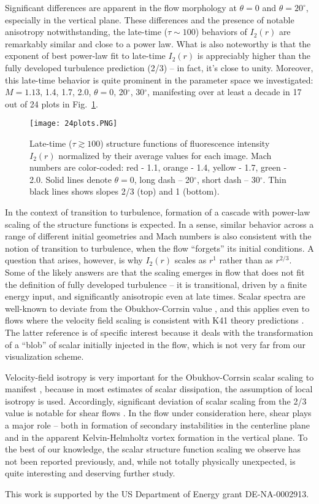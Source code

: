 \documentclass[preprint,superscriptaddress,showpacs]{revtex4-1}
\begin{document}
Significant differences are apparent in the flow morphology at $\theta=0$ and $\theta=20^\circ$, 
especially in the vertical plane. These differences and the presence 
of notable anisotropy notwithstanding,
the late-time ($\tau \sim 100$) behaviors of $I_2(r)$ are remarkably similar and close to a power law. What is 
also noteworthy is that the exponent of best power-law fit to late-time $I_2(r)$ is appreciably higher than
the fully developed turbulence prediction (2/3) -- in fact, it's close to unity. Moreover, this late-time 
behavior is quite prominent in the parameter space we investigated: $M = 1.13$, 1.4, 1.7, 2.0, 
$\theta=0$, 20$^\circ$, 30$^\circ$, manifesting over at least a decade in 17 out of 24 plots in 
Fig.~\ref{late-times}. 

\begin{figure}
\centerline{\texttt{[image: 24plots.PNG]}}
\caption{\label{late-times} Late-time ($\tau \gtrsim 100$) 
structure functions of fluorescence intensity $I_2(r)$ normalized by their average values for 
each image. Mach numbers are color-coded: red - 1.1, 
orange - 1.4, yellow - 1.7, green - 2.0. Solid lines denote $\theta=0$, long dash -- 20$^\circ$, 
short dash -- 30$^\circ$. Thin black lines shows slopes 2/3 (top) and 1 (bottom).}
\end{figure}

In the context of transition to turbulence, formation of a cascade with power-law scaling of the structure functions is expected. In a sense, similar behavior across a range of different initial geometries and 
Mach numbers is also consistent with the notion of transition to turbulence, when the flow ``forgets'' its
initial conditions. A question that arises, however, is why $I_2(r)$ scales as $r^1$ rather than as $r^{2/3}$. 
Some of the likely answers are that the scaling emerges in flow that does not fit the definition of 
fully developed turbulence -- it is transitional, driven by a finite energy input, and significantly 
anisotropic even at late times. Scalar spectra are well-known to deviate from the Obukhov-Corrsin value
\cite{celani}, and this applies even to flows where the velocity field scaling is consistent with 
K41 theory predictions \cite{sreenivasan96,innocenti2001}. The latter reference is of specific 
interest because it deals with the transformation of a ``blob'' of scalar initially injected in the
flow, which is not very far from our visualization scheme.

Velocity-field isotropy is very important
for the Obukhov-Corrsin scalar scaling to manifest \cite{sreenivasan96}, because in most estimates 
of scalar dissipation, the assumption of local isotropy is used. Accordingly, significant deviation of
scalar scaling from the 2/3 value is notable for shear flows \cite{sreenivasan96,celani}. 
In the flow under consideration here, shear plays a major role -- both in formation of secondary instabilities
in the centerline plane and in the apparent Kelvin-Helmholtz vortex formation in the vertical plane. 
To the best of our knowledge, the scalar structure function scaling we observe has not been reported 
previously, and, while not totally physically unexpected, is quite interesting and deserving further study. 
 
\noindent This work is supported by the US Department of Energy grant DE-NA-0002913.



\end{document}
